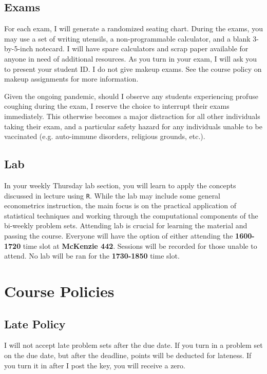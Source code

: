 \documentclass[10pt]{article}
\begin{document}
\subsection*{Exams} 

For each exam, I will generate a randomized seating chart. 
During the exams, you may use a set of writing utensils, a non-programmable calculator, and a blank 3-by-5-inch notecard. 
I will have spare calculators and scrap paper available for anyone in need of additional resources. 
As you turn in your exam, I will ask you to present your student ID. 
I do not give makeup exams. 
See the course policy on makeup assignments for more information.

\bigskip 

\noindent Given the ongoing pandemic, should I observe any students experiencing profuse coughing during the exam, I reserve the choice to interrupt their exams immediately.
This otherwise becomes a major distraction for all other individuals taking their exam, and a particular safety hazard for any individuals unable to be vaccinated (e.g. auto-immune disorders, religious grounds, etc.).

\subsection*{Lab} 

In your weekly Thursday lab section, you will learn to apply the concepts discussed in lecture using \texttt{R}. 
While the lab may include some general econometrics instruction, the main focus is on the practical application of statistical techniques and working through the computational components of the bi-weekly problem sets. 
Attending lab is crucial for learning the material and passing the course. 
Everyone will have the option of either attending the {\bf 1600-1720} time slot at {\bf McKenzie 442}. Sessions will be recorded for those unable to attend. 
No lab will be ran for the {\bf 1730-1850} time slot. 

\newpage

\section*{Course Policies}

\subsection*{Late Policy} 

I will not accept late problem sets after the due date. If you turn in a problem set on the due date, but after the deadline, points will be deducted for lateness. If you turn it in after I post the key, you will receive a zero.
\end{document}
